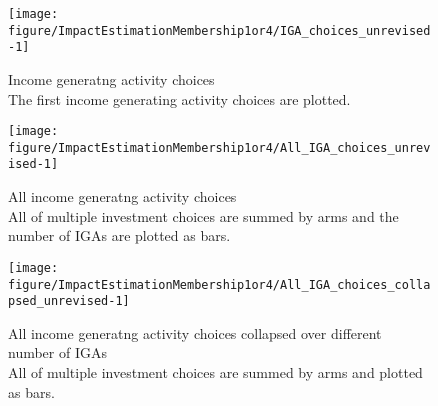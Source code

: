 \begin{Schunk}
\begin{figure}

{\centering \texttt{[image: figure/ImpactEstimationMembership1or4/IGA\_choices\_unrevised-1]} 

}

\caption{Income generatng activity choices\\ {\footnotesize The first income generating activity choices are plotted.\setlength{\baselineskip}{8pt}}}\label{Figure IGA choices unrevised}
\end{figure}
\end{Schunk}
\begin{Schunk}
\begin{figure}

{\centering \texttt{[image: figure/ImpactEstimationMembership1or4/All\_IGA\_choices\_unrevised-1]} 

}

\caption{All income generatng activity choices\\ {\footnotesize All of multiple investment choices are summed by arms and the number of IGAs are plotted as bars. \setlength{\baselineskip}{8pt}}}\label{Figure All IGA choices unrevised}
\end{figure}
\end{Schunk}
\begin{Schunk}
\begin{figure}

{\centering \texttt{[image: figure/ImpactEstimationMembership1or4/All\_IGA\_choices\_collapsed\_unrevised-1]} 

}

\caption{All income generatng activity choices collapsed over different number of IGAs\\ {\footnotesize All of multiple investment choices are summed by arms and plotted as bars. \setlength{\baselineskip}{8pt}}}\label{Figure All IGA choices collapsed unrevised}
\end{figure}
\end{Schunk}

